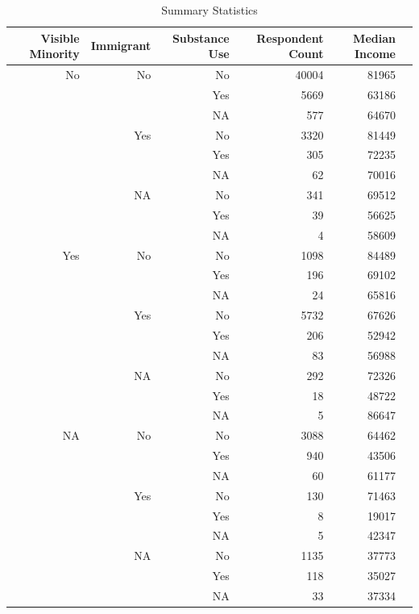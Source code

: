 \documentclass[11pt]{article}
\newcommand\T{\rule{0pt}{2.6ex}}       %
\begin{document}
{
\begin{table}[!htbp]
\caption{Summary Statistics}
\centering
\def\sym#1{\ifmmode^{#1}\else\(^{#1}\)\fi}
\begin{tabular}{rrrrrr}
  \hline
 Visible Minority & Immigrant & Substance Use & Respondent Count & Median Income \\
  \hline
  \T
   No & No & No & 40004 & 81965 \\
      &    &  Yes & 5669 & 63186 \\
      &    &  NA & 577 & 64670\\
      \cmidrule(l{4em}r{1em}){2-5}
      & Yes & No & 3320 & 81449 \\
      &  & Yes & 305 & 72235\\
      &  &  NA &  62 & 70016\\
      \cmidrule(l{4em}r{1em}){2-5}
      & NA & No & 341 & 69512\\
      &  & Yes &  39 & 56625 \\
      &  & NA &   4 & 58609\\
      \midrule
   Yes & No & No & 1098 & 84489 \\
       &  & Yes & 196 & 69102 \\
       &  & NA &  24 & 65816 \\
       \cmidrule(l{4em}r{1em}){2-5}
       & Yes & No & 5732 & 67626 \\
       &  & Yes & 206 & 52942 \\
       &  & NA &  83 & 56988 \\
       \cmidrule(l{4em}r{1em}){2-5}
       & NA & No & 292 & 72326 \\
       &  & Yes &  18 & 48722 \\
       &  & NA &   5 & 86647 \\
       \midrule
    NA  & No & No & 3088 & 64462 \\
        &  & Yes & 940 & 43506 \\
        &  & NA &  60 & 61177\\
        \cmidrule(l{4em}r{1em}){2-5}
        & Yes & No & 130 & 71463 \\
        &  & Yes &   8 & 19017 \\
        &  & NA &   5 & 42347 \\
        \cmidrule(l{4em}r{1em}){2-5}
        & NA & No & 1135 & 37773 \\
        &  & Yes & 118 & 35027 \\
        &  & NA &  33 & 37334 \\
   \hline
\end{tabular}
\end{table}
}
\end{document}
